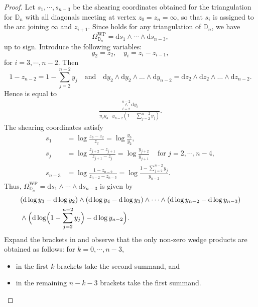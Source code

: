 \documentclass{amsart}
\theoremstyle{definition}
\begin{document}
\begin{proof}
Let $s_1, \cdots, s_{n-3}$ be the shearing coordinates obtained for the triangulation for $\mathbb{D}_n$ with all diagonals meeting at vertex $z_0 = z_n = \infty$, so that $s_i$ is assigned to the arc joining $\infty$ and $z_{i+1}$. Since  holds for any triangulation of $\mathbb{D}_n$, we have
\[
\Omega^{\mathrm{WP}}_{\mathbb{D}_n}
= 
\mathrm{d}s_1 \wedge \cdots \wedge \mathrm{d}s_{n-3},
\]
up to sign. Introduce the following variables:
\[
y_2 = z_2,
\quad
y_i = z_{i}-z_{i-1},
\]
for $i = 3, \cdots, n-2$. Then 
\[
1-z_{n-2} = 1- \sum_{j=2}^{n-2}y_j
\quad\text{and}\quad 
\mathrm{d}y_2\wedge \mathrm{d}y_2\wedge\ldots\wedge \mathrm{d}y_{n-2}
= 
\mathrm{d}z_2\wedge \mathrm{d}z_2\wedge\ldots\wedge \mathrm{d}z_{n-2}.
\]
Hence  is equal to
\begin{align}
\label{eq: dOmega}
\frac{\mathop{\wedge}\limits_{i=2}^{n-2} \mathrm{d}y_i }{y_2y_3\cdots y_{n-2}(1- \sum_{j=2}^{n-2}y_j)}.
\end{align}
The shearing coordinates satisfy
\begin{align*}
s_1 &= \log \tfrac{z_3-z_2}{z_2} = \log \tfrac{y_3}{y_2},\\
s_j &= \log \tfrac{z_{j+2}-z_{j+1}}{z_{j+1}-z_j} = \log \tfrac{y_{j+2}}{y_{j+1}} \,\quad \text{for }j = 2, \cdots, n-4,\\
s_{n-3} &= \log \tfrac{1-z_{n-2}}{z_{n-2}-z_{n-3}} = \log \tfrac{1- \sum_{j=2}^{n-2}y_j}{y_{n-2}}.
\end{align*}
Thus, $\Omega^{\mathrm{WP}}_{\mathbb{D}_n}=\mathrm{d}s_1 \wedge \cdots \wedge \mathrm{d}s_{n-3}$ is given by
\begin{equation}
\label{eq: dOmega'}
\begin{split}
& (\mathrm{d}\log y_3 - \mathrm{d}\log y_2)
\wedge 
(\mathrm{d}\log y_4 - \mathrm{d}\log y_3) 
\wedge \cdots \wedge 
(\mathrm{d}\log y_{n-2} - \mathrm{d}\log y_{n-3}) \\ 
& \wedge \Bigl(\mathrm{d}\log \Bigl(1- \sum_{j=2}^{n-2}y_j \Bigr) - \mathrm{d}\log y_{n-2} \Bigr).
\end{split}
\end{equation}
Expand the brackets in  and observe that the only non-zero wedge products are obtained as follows: for $k=0,\cdots, n-3$, 
\begin{itemize}
\item in the first $k$ brackets take the second summand, and
\item in the remaining $n-k-3$ brackets take the first summand.

\end{itemize}
\end{proof}
\end{document}
